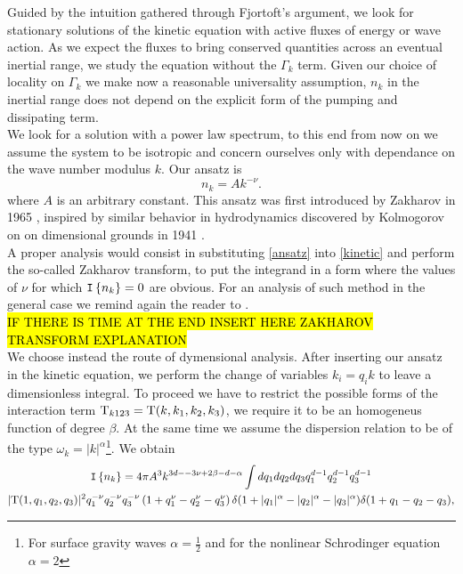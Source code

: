 Guided by the intuition gathered through Fjortoft's argument, we look for stationary solutions of the kinetic equation with active fluxes of energy or wave action. 
As we expect the fluxes to bring conserved quantities across an eventual inertial range, we study the equation without the $\Gamma_k$ term. Given our choice of locality
on $\Gamma_k$ we make now a reasonable universality assumption, $n_k$ in the inertial range does not depend on the explicit form of the pumping and dissipating term.\\
We look for a solution with a power law spectrum, to this end from now on we assume the system to be isotropic and concern ourselves only with dependance on the wave number 
modulus $k$. Our ansatz is  
\begin{equation}
    n_k = A k^{-\nu}.
    \label{ansatz}
\end{equation}
where $A$ is an arbitrary constant. 
This ansatz was first introduced by Zakharov in 1965 \cite{Zakharov1965}, inspired by similar behavior in hydrodynamics discovered by Kolmogorov on on dimensional grounds 
in 1941 \cite{1991}.\\
A proper analysis would consist in substituting \eqref{ansatz} into \eqref{kinetic} and perform the so-called Zakharov transform, to put the integrand in a form where 
the values of $\nu$ for which $\mathtt{I}\left\{n_k\right\} = 0$ are obvious. For an analysis of such method in the general case we remind again the reader to \cite{Zakharov}. \\
\hl{IF THERE IS TIME AT THE END INSERT HERE ZAKHAROV TRANSFORM EXPLANATION}\\
We choose instead the route of dymensional analysis. After inserting our ansatz in the kinetic equation, we perform the change of variables $k_i = q_i k$ to leave a 
dimensionless integral. To proceed we have to restrict the possible forms of the interaction term $\mathrm{T}_{k123} = \mathrm{T}(k, k_1, k_2, k_3) $, we require it to be an homogeneus function of degree $\beta$.
At the same time we assume the dispersion relation to be of the type $\omega_k = |k|^{\alpha}$\footnote{For surface gravity waves $\alpha = \frac{1}{2}$ and for the 
nonlinear Schrodinger equation $\alpha = 2$}. We obtain 
\begin{multline}
    \mathtt{I}\left\{n_k\right\} = 4\pi A^3 k^{3d- - 3\nu + 2\beta - d - \alpha} \int dq_1 dq_2 dq_3 q^{d-1}_1 q ^{d-1}_2 q^{d-1}_3 \\
    |\mathrm{T}(1, q_1, q_2, q_3)|^2 q_1^{-\nu}q_2^{-\nu}
    q_3^{-\nu}\left(1 + q_1^\nu - q_2^\nu - q_3^\nu \right) \delta (1 + |q_1|^\alpha - |q_2|^\alpha -|q_3|^\alpha)\delta(1 + q_1 - q_2 -q_3),
\end{multline} 
